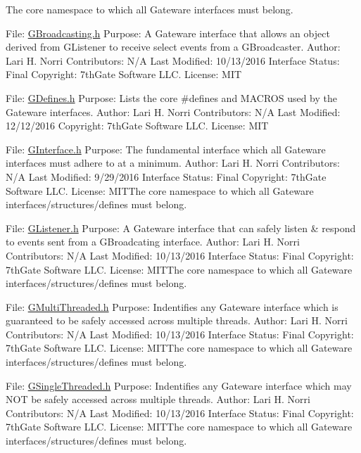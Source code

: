The core namespace to which all Gateware interfaces must belong.

File\+: \hyperlink{GBroadcasting_8h_source}{G\+Broadcasting.\+h} Purpose\+: A Gateware interface that allows an object derived from G\+Listener to receive select events from a G\+Broadcaster. Author\+: Lari H. Norri Contributors\+: N/A Last Modified\+: 10/13/2016 Interface Status\+: Final Copyright\+: 7th\+Gate Software L\+LC. License\+: M\+IT

File\+: \hyperlink{GDefines_8h_source}{G\+Defines.\+h} Purpose\+: Lists the core \#defines and M\+A\+C\+R\+OS used by the Gateware interfaces. Author\+: Lari H. Norri Contributors\+: N/A Last Modified\+: 12/12/2016 Copyright\+: 7th\+Gate Software L\+LC. License\+: M\+IT

File\+: \hyperlink{GInterface_8h_source}{G\+Interface.\+h} Purpose\+: The fundamental interface which all Gateware interfaces must adhere to at a minimum. Author\+: Lari H. Norri Contributors\+: N/A Last Modified\+: 9/29/2016 Interface Status\+: Final Copyright\+: 7th\+Gate Software L\+LC. License\+: M\+I\+T\+The core namespace to which all Gateware interfaces/structures/defines must belong.

File\+: \hyperlink{GListener_8h_source}{G\+Listener.\+h} Purpose\+: A Gateware interface that can safely listen \& respond to events sent from a G\+Broadcating interface. Author\+: Lari H. Norri Contributors\+: N/A Last Modified\+: 10/13/2016 Interface Status\+: Final Copyright\+: 7th\+Gate Software L\+LC. License\+: M\+I\+T\+The core namespace to which all Gateware interfaces/structures/defines must belong.

File\+: \hyperlink{GMultiThreaded_8h_source}{G\+Multi\+Threaded.\+h} Purpose\+: Indentifies any Gateware interface which is guaranteed to be safely accessed across multiple threads. Author\+: Lari H. Norri Contributors\+: N/A Last Modified\+: 10/13/2016 Interface Status\+: Final Copyright\+: 7th\+Gate Software L\+LC. License\+: M\+I\+T\+The core namespace to which all Gateware interfaces/structures/defines must belong.

File\+: \hyperlink{GSingleThreaded_8h_source}{G\+Single\+Threaded.\+h} Purpose\+: Indentifies any Gateware interface which may N\+OT be safely accessed across multiple threads. Author\+: Lari H. Norri Contributors\+: N/A Last Modified\+: 10/13/2016 Interface Status\+: Final Copyright\+: 7th\+Gate Software L\+LC. License\+: M\+I\+T\+The core namespace to which all Gateware interfaces/structures/defines must belong.


